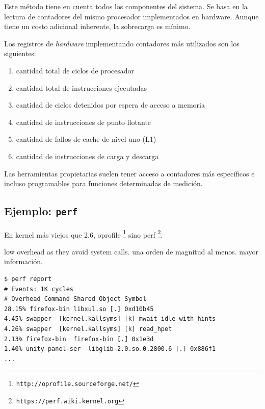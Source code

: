 \documentclass[a4paper]{report}
\begin{document}
Este método tiene en cuenta todos los componentes del sistema.
Se basa en la lectura de contadores del mismo procesador implementados en hardware.
Aunque tiene un costo adicional inherente, la sobrecarga es mínimo.

Los registros de {\it hardware} implementando contadores más utilizados son los
siguientes:

\begin{enumerate}
\item cantidad total de ciclos de procesador
\item cantidad total de instrucciones ejecutadas
\item cantidad de ciclos detenidos por espera de acceso a memoria
\item cantidad de instrucciones de punto flotante
\item cantidad de fallos de cache de nivel uno (L1)
\item cantidad de instrucciones de carga y descarga
\end{enumerate}

Las herramientas propietarias suelen tener acceso a contadores más específicos e
incluso programables para funciones determinadas de medición.

\subsection{Ejemplo: {\tt perf}}

En kernel más viejos que 2.6, oprofile \footnote{\tt http://oprofile.sourceforge.net/} sino perf \footnote{\tt https://perf.wiki.kernel.org}.

low overhead as they avoid system calls. una orden de magnitud al menos. mayor información.

\begin{lstlisting}
$ perf report
# Events: 1K cycles
# Overhead Command Shared Object Symbol
28.15% firefox-bin libxul.so [.] 0xd10b45
4.45% swapper  [kernel.kallsyms] [k] mwait_idle_with_hints
4.26% swapper  [kernel.kallsyms] [k] read_hpet
2.13% firefox-bin  firefox-bin [.] 0x1e3d
1.40% unity-panel-ser  libglib-2.0.so.0.2800.6 [.] 0x886f1
...
\end{lstlisting}
\end{document}
